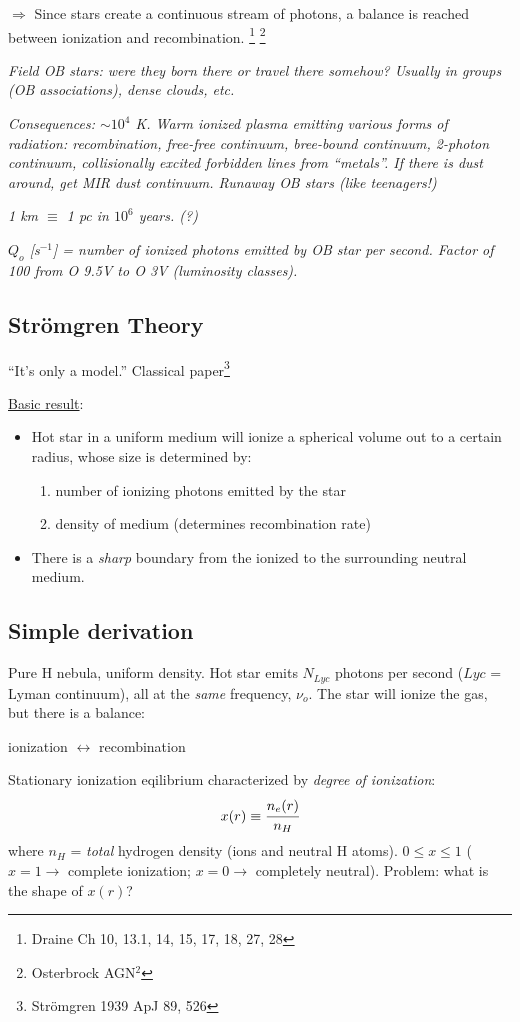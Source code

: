 \documentclass[12pt]{article}
\newcommand{\mar}[1]{\hspace{0pt}\marginpar{-\textcolor{black}{#1}-}}
\newcommand{\mynotes}[1]{{\fontfamily{cmss}\selectfont \textit{#1}}}
\begin{document}
\textcolor{bred}{$\Longrightarrow$}
{Since stars create a continuous stream of photons, a
balance is reached between ionization and recombination.}
\footnote{Draine Ch 10, 13.1, 14, 15, 17, 18, 27, 28}
\footnote{Osterbrock AGN$^{2}$}

\mynotes{Field OB stars: were they born there or travel there somehow? Usually
in groups (OB associations), dense clouds, etc.}

\mynotes{Consequences: $\sim 10^{4}$ K. Warm ionized plasma emitting various forms
of radiation: recombination, free-free continuum, bree-bound continuum,
2-photon continuum, collisionally excited forbidden lines from ``metals''.
If there is dust around, get MIR dust continuum. Runaway OB stars (like
teenagers!)}

\mynotes{1 km $\equiv$ 1 pc in $10^{6}$ years. (?)}

\mynotes{$Q_{o}$ [s$^{-1}$]
= number of ionized photons emitted by OB star per second.
Factor of 100 from O 9.5V to O 3V (luminosity classes).}

\subsection{Str\"{o}mgren Theory}
\mar{52}``It's only a model.''
Classical paper\footnote{Str\"{o}mgren 1939 ApJ 89, 526}

\underline{Basic result}:
\begin{itemize}
    \item Hot star in a uniform medium will ionize a spherical volume
        out to a certain radius, whose size is determined by:
        \begin{enumerate}
            \item number of ionizing photons emitted by the star
            \item density of medium (determines recombination rate)
        \end{enumerate}
    \item There is a \emph{sharp} boundary from the ionized to the
        surrounding neutral medium.
\end{itemize}
\subsection{Simple derivation}
Pure H nebula, uniform density. Hot star emits $N_{Lyc}$ photons per
second ($Lyc$ = Lyman continuum), all at the \emph{same} frequency, $\nu_{o}$.
The star will ionize the gas, but there is a balance:
\begin{center}
    \vspace{-2ex}ionization $\longleftrightarrow$ recombination\vspace{-2ex}
\end{center}
Stationary ionization eqilibrium characterized by \textit{degree of ionization}:
\[
    x(r) \equiv \cfrac{n_{e}(r)}{n_{H}}
    \]
where $n_{H}$ = \emph{total}
hydrogen density (ions and neutral H atoms).
$0 \le x \le 1$ ($x = 1 \rightarrow$ complete ionization; $x = 0
\rightarrow$ completely neutral). Problem: what is the shape of $x(r)$?
\end{document}
